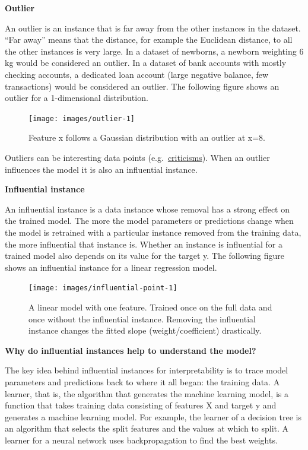 \documentclass[
  12pt,
]{krantz}
\begin{document}
\textbf{Outlier}

An outlier is an instance that is far away from the other instances in the dataset.
``Far away'' means that the distance, for example the Euclidean distance, to all the other instances is very large.
In a dataset of newborns, a newborn weighting 6 kg would be considered an outlier.
In a dataset of bank accounts with mostly checking accounts, a dedicated loan account (large negative balance, few transactions) would be considered an outlier.
The following figure shows an outlier for a 1-dimensional distribution.

\begin{figure}

{\centering \texttt{[image: images/outlier-1]} 

}

\caption{Feature x follows a Gaussian distribution with an outlier at x=8.}\label{fig:outlier}
\end{figure}

Outliers can be interesting data points (e.g.~\protect\hyperlink{proto}{criticisms}).
When an outlier influences the model it is also an influential instance.

\textbf{Influential instance}

An influential instance is a data instance whose removal has a strong effect on the trained model.
The more the model parameters or predictions change when the model is retrained with a particular instance removed from the training data, the more influential that instance is. Whether an instance is influential for a trained model also depends on its value for the target y.
The following figure shows an influential instance for a linear regression model.

\begin{figure}

{\centering \texttt{[image: images/influential-point-1]} 

}

\caption{A linear model with one feature. Trained once on the full data and once without the influential instance. Removing the influential instance changes the fitted slope (weight/coefficient) drastically.}\label{fig:influential-point}
\end{figure}

\textbf{Why do influential instances help to understand the model?}

The key idea behind influential instances for interpretability is to trace model parameters and predictions back to where it all began: the training data.
A learner, that is, the algorithm that generates the machine learning model, is a function that takes training data consisting of features X and target y and generates a machine learning model.
For example, the learner of a decision tree is an algorithm that selects the split features and the values at which to split.
A learner for a neural network uses backpropagation to find the best weights.
\end{document}

